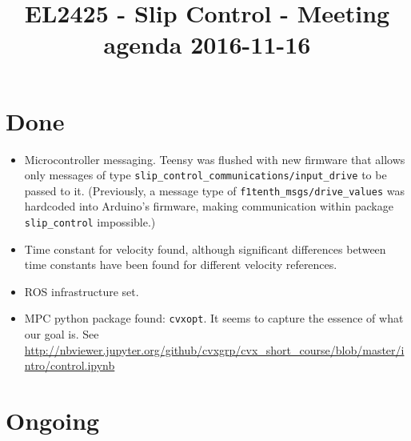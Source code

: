 \documentclass[oneside,12pt]{article}
\title{EL2425 - Slip Control - Meeting agenda 2016-11-16}
\begin{document}
\maketitle

\section{Done}

\begin{itemize}
  \item Microcontroller messaging. Teensy was flushed with new firmware that
    allows only messages of type \texttt{slip\_control\_communications/input\_drive}
    to be passed to it. (Previously, a message type of \texttt{f1tenth\_msgs/drive\_values}
    was hardcoded into Arduino's firmware, making communication within package
    \texttt{slip\_control} impossible.)
  \item Time constant for velocity found, although significant differences
    between time constants have been found for different velocity references.
  \item ROS infrastructure set.
  \item MPC python package found: \texttt{cvxopt}. It seems to capture the
    essence of what our goal is. See \url{http://nbviewer.jupyter.org/github/cvxgrp/cvx_short_course/blob/master/intro/control.ipynb}
\end{itemize}



\section{Ongoing}
\end{document}
